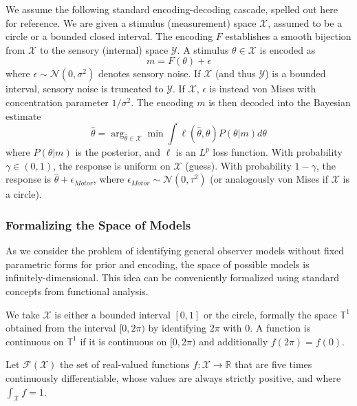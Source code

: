 We assume the following standard encoding-decoding cascade, spelled out here for reference.
We are given a stimulus (measurement) space $\mathcal{X}$, assumed to be a circle or a bounded closed interval.
The encoding $F$ establishes a smooth bijection from $\mathcal{X}$ to the sensory (internal) space $\mathcal{Y}$.
A stimulus $\theta \in \mathcal{X}$ is encoded as
\begin{equation}
    m = F(\theta) + \epsilon
\end{equation}
where $\epsilon \sim \mathcal{N}(0,\sigma^2)$ denotes sensory noise. If $\mathcal{X}$ (and thus $\mathcal{Y}$) is a bounded interval, sensory noise is truncated to $\mathcal{Y}$. If $\mathcal{X}$, $\epsilon$ is instead von Mises with concentration parameter $1/\sigma^2$.
The encoding $m$ is then decoded into the Bayesian estimate
\begin{equation}
    \widehat{\theta} = \arg_{\widehat{\theta}\in\mathcal{X}}\min\int\ell(\hat{\theta},\theta) P(\theta|m)d\theta
\end{equation}
where $P(\theta|m)$ is the posterior, and $\ell$ is an $L^p$ loss function.
With probability $\gamma \in (0,1)$, the response is uniform on $\mathcal{X}$ (guess).
With probability $1-\gamma$, the response is $\widehat{\theta} + \epsilon_{Motor}$, where $\epsilon_{Motor} \sim \mathcal{N}(0,\tau^2)$ (or analogously von Mises if $\mathcal{X}$ is a circle).

\subsubsection{Formalizing the Space of Models}\label{sec:space-of-models}
As we consider the problem of identifying general observer models without fixed parametric forms for prior and encoding, the space of possible models is infinitely-dimensional. This idea can be conveniently formalized using standard  concepts from functional analysis.

We take $\mathcal{X}$ is either a bounded interval $[0,1]$ or the circle, formally the space $\mathbb{T}^1$ obtained from the interval $[0,2\pi)$ by identifying $2\pi$ with $0$.
A function is continuous on $\mathbb{T}^1$ if it is continuous on $[0,2\pi)$ and additionally $f(2\pi) = f(0)$. 

\begin{defin}
Let $\mathcal{F}(\mathcal{X})$ the set of real-valued functions $f : \mathcal{X} \rightarrow \mathbb{R}$ that are five times continuously differentiable, whose values are always strictly positive, and where $\int_{\mathcal{X}} f = 1$.


    
\end{defin}

